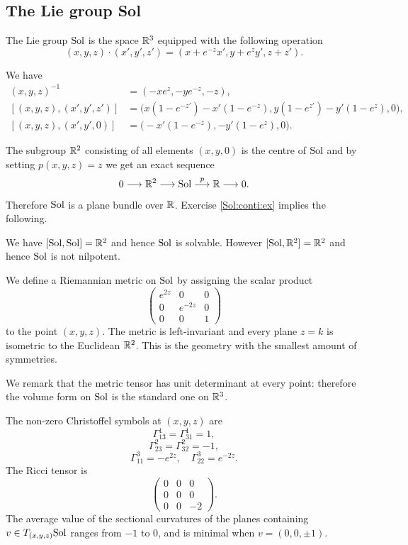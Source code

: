 \subsection{The Lie group Sol}
The Lie group ${\rm Sol}$ is the space $\mathbb{R}^3$ equipped with the following operation
$$(x,y,z)\cdot(x',y',z') = (x+ e^{-z}x', y+e^zy', z+z').$$
\begin{ex} \label{Sol:conti:ex}
We have
\begin{align*}
(x,y,z)^{-1} & = (-xe^z, -ye^{-z}, -z), \\
[(x,y,z),(x',y',z')] & = \big(x(1\!-\!e^{-z'}) - x'(1\!-\!e^{-z}), y(1\!-\!e^{z'}) - y'(1\!-\!e^z), 0\big), \\
[(x,y,z), (x',y',0)] & = \big(- x'(1-e^{-z}), - y'(1 - e^z), 0\big). \
\end{align*}
\end{ex}
The subgroup $\mathbb{R}^2$ consisting of all elements $(x,y,0)$ is the centre of ${\rm Sol}$ and by setting $p(x,y,z)=z$ we get an exact sequence
$$0 \longrightarrow \mathbb{R}^2 \longrightarrow {\rm Sol} \stackrel p \longrightarrow \mathbb{R} \longrightarrow 0.$$
Therefore ${\rm Sol}$ is a plane bundle over $\mathbb{R}$. Exercise \ref{Sol:conti:ex} implies the following.
\begin{ex} We have $[{\rm Sol}, {\rm Sol}] = \mathbb{R}^2$ and hence ${\rm Sol}$ is solvable. However $[{\rm Sol}, \mathbb{R}^2] = \mathbb{R}^2$ and hence ${\rm Sol}$ is not nilpotent.
\end{ex}

We define a Riemannian metric on ${\rm Sol}$ by assigning the scalar product
$$\begin{pmatrix}
e^{2z} & 0 & 0 \\
0 & e^{-2z} & 0 \\
0 & 0 & 1
\end{pmatrix}
$$
to the point $(x,y,z)$. The metric is left-invariant and every plane $z=k$ is isometric to the Euclidean $\mathbb{R}^2$. This is the geometry with the smallest amount of symmetries.

We remark that the metric tensor has unit determinant at every point: therefore the volume form on ${\rm Sol}$ is the standard one on $\mathbb{R}^3$.

The non-zero Christoffel symbols at $(x,y,z)$ are
$$\Gamma^1_{13} = \Gamma^1_{31} = 1,$$
$$\Gamma^2_{23} = \Gamma^2_{32} = -1,$$
$$\Gamma^3_{11} = -e^{2z}, \quad \Gamma^3_{22} = e^{-2z}.$$
The Ricci tensor is
$$\begin{pmatrix}
0 & 0 & 0 \\
0 & 0 & 0 \\
0 & 0 & -2
\end{pmatrix}.
$$
The average value of the sectional curvatures of the planes containing $v\in T_{(x,y,z)} {\rm Sol}$ ranges from $-1$ to $0$, and is minimal when $v=(0,0,\pm 1)$.

